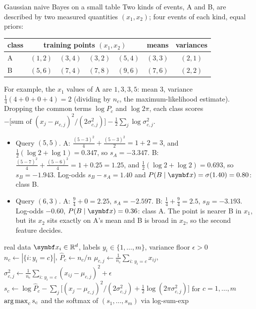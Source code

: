 \documentclass[11pt]{article}
\begin{document}
\begin{worked}{Gaussian naive Bayes on a small table}
Two kinds of events, A and B, are described by two measured quantities $(x_1, x_2)$; four events of each kind, equal
priors:

\begin{center}\small
\begin{tabular}{@{}lcccc@{\qquad}cc@{}}\toprule
class & \multicolumn{4}{c}{training points $(x_1, x_2)$} & means & variances \\ \midrule
A & $(1, 2)$ & $(3, 4)$ & $(3, 2)$ & $(5, 4)$ & $(3, 3)$ & $(2, 1)$ \\
B & $(5, 6)$ & $(7, 4)$ & $(7, 8)$ & $(9, 6)$ & $(7, 6)$ & $(2, 2)$ \\ \bottomrule
\end{tabular}
\end{center}

For example, the $x_1$ values of A are $1, 3, 3, 5$: mean $3$, variance $\tfrac14(4 + 0 + 0 + 4) = 2$ (dividing by
$n_c$, the maximum-likelihood estimate). Dropping the common terms $\log P_c$ and $\log 2\pi$, each class scores
$-\big[\text{sum of } (x_j - \mu_{c,j})^2/(2\sigma_{c,j}^2)\big] - \tfrac12 \sum_j \log \sigma_{c,j}^2$.
\begin{itemize}
\item Query $(5, 5)$. A: $\tfrac{(5-3)^2}{4} + \tfrac{(5-3)^2}{2} = 1 + 2 = 3$, and $\tfrac12(\log 2 + \log 1) = 0.347$, so
$s_A = -3.347$. B: $\tfrac{(5-7)^2}{4} + \tfrac{(5-6)^2}{4} = 1 + 0.25 = 1.25$, and $\tfrac12(\log 2 + \log 2) = 0.693$,
so $s_B = -1.943$. Log-odds $s_B - s_A = 1.40$ and $P(B \mid \x) = \sigma(1.40) = 0.80$: class B.
\item Query $(6, 3)$. A: $\tfrac{9}{4} + 0 = 2.25$, $s_A = -2.597$. B: $\tfrac14 + \tfrac94 = 2.5$, $s_B = -3.193$.
Log-odds $-0.60$, $P(B \mid \x) = 0.36$: class A. The point is nearer B in $x_1$, but its $x_2$ sits exactly on A's mean
and B is broad in $x_2$, so the second feature decides.
\end{itemize}
\end{worked}

\begin{algorithm}[H]
\caption{Gaussian naive Bayes}\label{alg:gnb}
\footnotesize
\begin{algorithmic}[1]
\Require real data $\x_i \in \R^d$, labels $y_i \in \{1, \dots, m\}$, variance floor $\epsilon > 0$
    \State $n_c \gets |\{i : y_i = c\}|$, \quad $\hat P_c \gets n_c/n$
      \State $\mu_{c,j} \gets \frac{1}{n_c}\sum_{i:\, y_i = c} x_{ij}$, \quad $\sigma^2_{c,j} \gets \frac{1}{n_c}\sum_{i:\, y_i = c} (x_{ij} - \mu_{c,j})^2 + \epsilon$
    \EndFor
  \EndFor
\EndFunction
{}
  \State $s_c \gets \log \hat P_c - \sum_{j} \big[(x_j - \mu_{c,j})^2/(2\sigma^2_{c,j}) + \tfrac12 \log(2\pi\sigma^2_{c,j})\big]$ for $c = 1, \dots, m$
  \State \Return $\operatorname*{arg\,max}_c s_c$ and the softmax of $(s_1, \dots, s_m)$ via log-sum-exp
\EndFunction
\end{algorithmic}
\end{algorithm}
\end{document}
